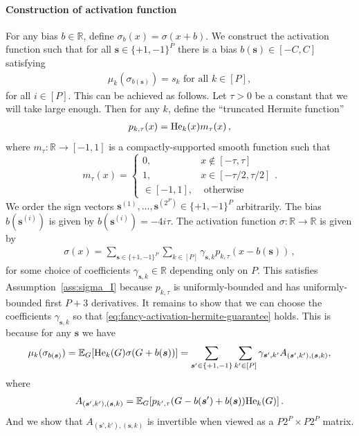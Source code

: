 \documentclass[11pt]{article}
\newcommand{\E}{\mathbb{E}}
\newcommand{\R}{\mathbb{R}}
\newcommand{\<}{\langle}
\renewcommand{\>}{\rangle}
\theoremstyle{definition}
\def\bs{{\boldsymbol s}}
\def\He{{\rm He}}
\def\He{{\rm He}}
\begin{document}
\paragraph*{Construction of activation function}
For any bias $b \in \R$, define $\sigma_b(x) = \sigma(x + b)$. We construct the activation function such that for all $\bs \in \{+1,-1\}^P$ there is a bias $ b(\bs) \in [-C,C]$ satisfying 
\begin{align}\label{eq:fancy-activation-hermite-guarantee}
\mu_k(\sigma_{b(\bs)}) = s_k \mbox{ for all } k \in [P],
\end{align}
for all $i \in [P]$. This can be achieved as follows. Let $\tau > 0$ be a constant that we will take large enough. Then for any $k$, define the ``truncated Hermite function''
\begin{align*}
p_{k,\tau}(x) = \He_k(x) m_{\tau}(x)\,,
\end{align*}
where $m_{\tau} : \R \to [-1,1]$ is a compactly-supported smooth function such that $$m_{\tau}(x) = \begin{cases} 0, & x \not\in [-\tau,\tau] \\ 1, & x \in [-\tau/2,\tau/2] \\ \in [-1,1], & \mbox{ otherwise}\end{cases}.$$
We order the sign vectors $\bs^{(1)},\ldots,\bs^{(2^P)} \in \{+1,-1\}^P$ arbitrarily. The bias $b(\bs^{(i)})$ is given by $b(\bs^{(i)}) = -4i\tau$. The activation function $\sigma : \R \to \R$ is given by
\begin{align*}
\sigma(x) = \sum_{\bs \in \{+1,-1\}^P} \sum_{k \in [P]} \gamma_{\bs,k} p_{k,\tau}(x - b(\bs))\,,
\end{align*}
for some choice of coefficients $\gamma_{\bs,k} \in \R$ depending only on $P$. This satisfies Assumption~\ref{ass:sigma_I} because $p_{k,\tau}$ is uniformly-bounded and has uniformly-bounded first $P+3$ derivatives. It remains to show that we can choose the coefficients $\gamma_{\bs,k}$ so that \eqref{eq:fancy-activation-hermite-guarantee} holds. This is because for any $\bs$ we have
\begin{align*}
\mu_k(\sigma_{b(\bs)}) = \E_G[\He_k(G) \sigma(G + b(\bs))] = \sum_{\bs' \in \{+1,-1\}} \sum_{k' \in [P]} \gamma_{\bs',k'} A_{(\bs',k'),(\bs,k)},
\end{align*}
where
\begin{align*}
A_{(\bs',k'), (\bs,k)} = \E_{G}[p_{k',\tau}(G - b(\bs') + b(\bs)) \He_k(G)]\,.
\end{align*}
And we show that $A_{(\bs',k'),(\bs,k)}$ is invertible when viewed as a $P2^P \times P2^P$ matrix.
\end{document}
